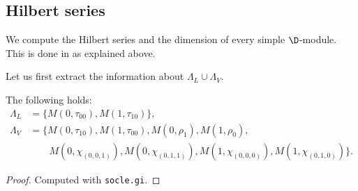 \subsection{Hilbert series}\label{sec:hilbert}

We compute the Hilbert series and the dimension of every simple $\D$-module. This is done in  as explained above.

Let us first extract the information about $\Lambda_L\cup\Lambda_V$.
\begin{lemma}
	The following holds:
	\begin{align*}
		\Lambda_L&= \{M(0,\tau_{00}), M(1,\tau_{10})\}, \\
		\Lambda_V&=\{M(0,\tau_{10}), M(1,\tau_{00}), M(0,\rho_{1}), M(1,\rho_{0}), \\
		&\qquad M(0,\chi_{(0,0,1)}), M(0,\chi_{(0,1,1)}), M(1,\chi_{(0,0,0)}), M(1,\chi_{(0,1,0)})\}.
	\end{align*}
\end{lemma}
\begin{proof}
	Computed with \texttt{socle.gi}.
\end{proof}
